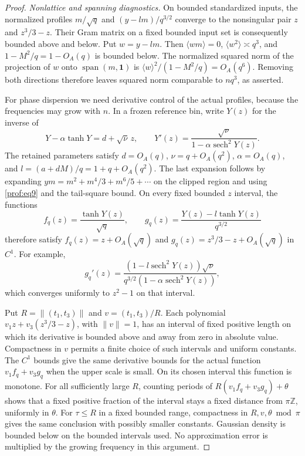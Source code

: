 \begin{proof}
\par\smallskip\noindent\textit{Nonlattice and spanning diagnostics.}\enspace
On bounded standardized inputs, the normalized profiles
$m/\sqrt q$ and $(y-lm)/q^{3/2}$ converge to the nonsingular pair
$z$ and $z^3/3-z$. Their Gram matrix on a fixed bounded input set is
consequently bounded above and below. Put $w=y-lm$.
Then $\langle wm\rangle=0$, $\langle w^2\rangle\asymp q^3$, and
$1-M^2/q=1-O_A(q)$ is bounded below. The normalized squared norm of
the projection of $w$ onto $\operatorname{span}(m,\mathbf1)$ is
$\langle w\rangle^2/(1-M^2/q)=O_A(q^6)$. Removing both directions
therefore leaves squared norm comparable to $nq^3$, as asserted.

For phase dispersion we need derivative control of the actual profiles,
because the frequencies may grow with $n$. In a frozen reference bin,
write $Y(z)$ for the inverse of
\[
 Y-\alpha\tanh Y=d+\sqrt\nu\,z,
 \qquad
 Y'(z)=\frac{\sqrt\nu}{1-\alpha\operatorname{sech}^2Y(z)}.
\]
The retained parameters satisfy $d=O_A(q)$, $\nu=q+O_A(q^2)$,
$\alpha=O_A(q)$, and
$l=(a+dM)/q=1+q+O_A(q^2)$. The last expansion follows by expanding
$ym=m^2+m^4/3+m^6/5+\cdots$ on the clipped region and using
\eqref{prof:eq9} and the tail-square bound. On every fixed bounded
$z$ interval, the functions
\[
 f_q(z)=\frac{\tanh Y(z)}{\sqrt q},\qquad
 g_q(z)=\frac{Y(z)-l\tanh Y(z)}{q^{3/2}}
\]
therefore satisfy
$f_q(z)=z+O_A(\sqrt q)$ and
$g_q(z)=z^3/3-z+O_A(\sqrt q)$ in $C^1$. For example,
\[
 g_q'(z)=
 \frac{(1-l\operatorname{sech}^2Y(z))\sqrt\nu}
 {q^{3/2}(1-\alpha\operatorname{sech}^2Y(z))},
\]
which converges uniformly to $z^2-1$ on that interval.

Put $R=\|(t_1,t_3)\|$ and $v=(t_1,t_3)/R$. Each polynomial
$v_1z+v_3(z^3/3-z)$, with $\|v\|=1$, has an interval of fixed
positive length on which its derivative is bounded above and away
from zero in absolute value. Compactness in $v$ permits a finite
choice of such intervals and uniform constants. The $C^1$ bounds
give the same derivative bounds for the actual function
$v_1f_q+v_3g_q$ when the upper scale is small. On its chosen interval
this function is monotone. For all sufficiently large $R$, counting
periods of $R(v_1f_q+v_3g_q)+\theta$ shows that a fixed positive
fraction of the interval stays a fixed distance from $\pi\mathbb Z$,
uniformly in $\theta$. For $\tau\le R$ in a fixed bounded range,
compactness in $R,v,\theta\bmod\pi$ gives the same conclusion with
possibly smaller constants. Gaussian density is bounded below on
the bounded intervals used. No approximation error is multiplied
by the growing frequency in this argument.


\end{proof}
